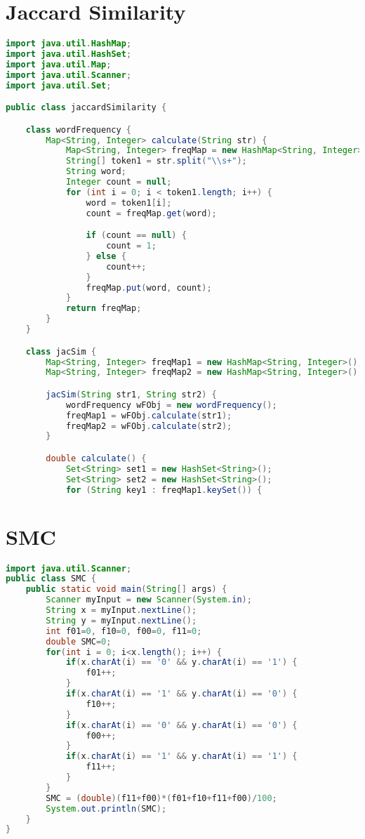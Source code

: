 \documentclass{article}
\begin{document}
\section{Jaccard Similarity}
\begin{lstlisting}[language=Java, caption=Jaccard Similarity Implementation]
import java.util.HashMap;
import java.util.HashSet;
import java.util.Map;
import java.util.Scanner;
import java.util.Set;

public class jaccardSimilarity {

    class wordFrequency {
        Map<String, Integer> calculate(String str) {
            Map<String, Integer> freqMap = new HashMap<String, Integer>();
            String[] token1 = str.split("\\s+");
            String word;
            Integer count = null;
            for (int i = 0; i < token1.length; i++) {
                word = token1[i];
                count = freqMap.get(word);

                if (count == null) {
                    count = 1;
                } else {
                    count++;
                }
                freqMap.put(word, count);
            }
            return freqMap;
        }
    }

    class jacSim {
        Map<String, Integer> freqMap1 = new HashMap<String, Integer>();
        Map<String, Integer> freqMap2 = new HashMap<String, Integer>();

        jacSim(String str1, String str2) {
            wordFrequency wFObj = new wordFrequency();
            freqMap1 = wFObj.calculate(str1);
            freqMap2 = wFObj.calculate(str2);
        }

        double calculate() {
            Set<String> set1 = new HashSet<String>();
            Set<String> set2 = new HashSet<String>();
            for (String key1 : freqMap1.keySet()) {
\end{lstlisting}

\section{SMC}
\begin{lstlisting}[language=Java, caption=SMC]
import java.util.Scanner;
public class SMC {
	public static void main(String[] args) {
		Scanner myInput = new Scanner(System.in);
		String x = myInput.nextLine();
		String y = myInput.nextLine();
		int f01=0, f10=0, f00=0, f11=0;
		double SMC=0;
		for(int i = 0; i<x.length(); i++) {
			if(x.charAt(i) == '0' && y.charAt(i) == '1') {
				f01++;
			}
			if(x.charAt(i) == '1' && y.charAt(i) == '0') {
				f10++;
			}
			if(x.charAt(i) == '0' && y.charAt(i) == '0') {
				f00++;
			}
			if(x.charAt(i) == '1' && y.charAt(i) == '1') {
				f11++;
			}
		}
		SMC = (double)(f11+f00)*(f01+f10+f11+f00)/100;
		System.out.println(SMC);
	}
}


\end{lstlisting}
\end{document}

